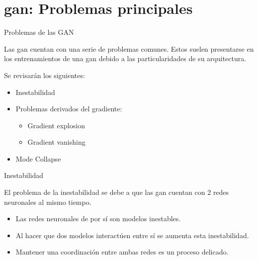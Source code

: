 
\section{\gls{gan}: Problemas principales}

\begin{frame}{Problemas de las GAN}

    Las \gls{gan} cuentan con una serie de \alert{problemas comunes}. Estos suelen presentarse en los entrenamientos de una \gls{gan} debido a las particularidades de su \alert{arquitectura}.
    
    Se revisarán los siguientes:
    \begin{itemize}
        \item Inestabilidad
        \item Problemas derivados del gradiente:
        \begin{itemize}
            \item Gradient explosion
            \item Gradient vanishing
        \end{itemize}
        \item Mode Collapse
    \end{itemize}
    
\end{frame}

\begin{frame}{Inestabilidad}

    {\Large El problema de la \alert{inestabilidad} se debe a que las \gls{gan} cuentan con \alert{2} redes neuronales al mismo tiempo.}
    
    \begin{itemize}
        \item Las redes neuronales de por sí son modelos \alert{inestables}.
        \item Al hacer que dos modelos \alert{interactúen} entre sí se \alert{aumenta esta inestabilidad}.
        \item Mantener una \alert{coordinación} entre ambas redes es un \alert{proceso delicado}.
    \end{itemize}
    
\end{frame}

